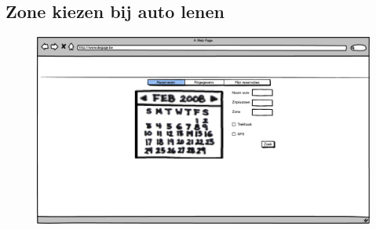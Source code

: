 \documentclass[11pt,a4paper,oneside]{article}
\begin{document}
\subsection{Zone kiezen bij auto lenen}
\begin{figure}[H]\includegraphics[width=\textwidth]{../../mockups/delen_reserveren.png}\end{figure}
\end{document}
